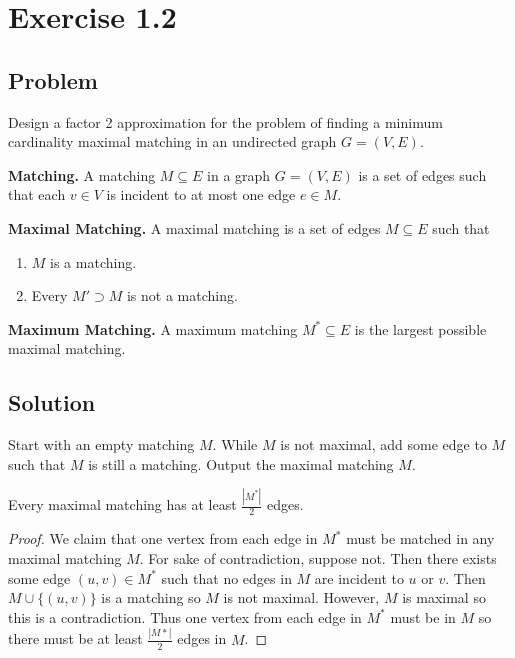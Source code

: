 \documentclass{article}
\begin{document}
\section*{Exercise 1.2}

\subsection*{Problem}

Design a factor 2 approximation for the problem of finding a minimum cardinality 
maximal matching in an undirected graph $G = (V, E)$. \newline

\textbf{Matching.} A matching $M \subseteq E$ in a graph $G = (V, E)$ is a set of edges
such that each $v \in V$ is incident to at most one edge $e \in M$. \newline

\textbf{Maximal Matching.} A maximal matching is a set of edges $M \subseteq E$ such 
that \begin{enumerate}
    \item $M$ is a matching.
    \item Every $M' \supset M$ is not a matching. 
\end{enumerate}

\textbf{Maximum Matching.} A maximum matching $M^* \subseteq E$ is the largest possible
maximal matching.

\subsection*{Solution}

Start with an empty matching $M$. While $M$ is not maximal, add some edge to $M$ such 
that $M$ is still a matching. Output the maximal matching $M$.

\begin{lemma*}
    Every maximal matching has at least $\frac{|M^*|}{2}$ edges.
\end{lemma*}

\begin{proof}
    We claim that one vertex from each edge in $M^*$ must be matched in any maximal 
    matching $M$. For sake of contradiction, suppose not. Then there exists some edge
    $(u, v) \in M^*$ such that no edges in $M$ are incident to $u$ or $v$. Then 
    $M \cup \{(u, v)\}$ is a matching so $M$ is not maximal. However, $M$ is maximal so 
    this is a contradiction. Thus one vertex from each edge in $M^*$ must be in $M$ so 
    there must be at least $\frac{|M*|}{2}$ edges in $M$.
\end{proof}
\end{document}
